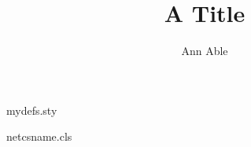 \begin{filecontents*}[overwrite]{mydefs.sty}
\newcommand\mycorr{ann.able@lunar.org}
\end{filecontents*}
\begin{filecontents*}[overwrite]{netcsname.cls}
\newcommand\corr[1]{\expandafter\gdef\csname nc@corr\endcsname{#1}}
\renewcommand\maketitle{\par\begingroup\centering{\Large\@title\par}%
  {\@author\thanks{Corresponding author: \csname nc@corr\endcsname}\par}\@thanks\endgroup}
\end{filecontents*}
\documentclass{netcsname}
\usepackage{mydefs}

\title{A Title}
\author{Ann Able}
\corr{\mycorr}
\maketitle
Text.

